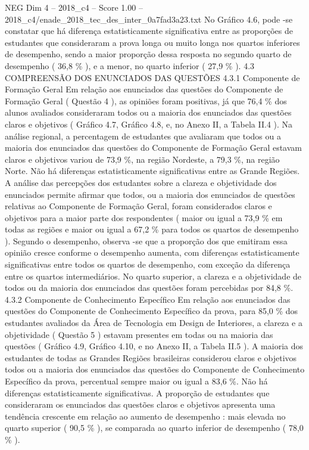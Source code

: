 \begin{textsample}{NEG Dim 4 – 2018\_c4 – Score 1.00 – 2018\_c4/enade\_2018\_tec\_des\_inter\_0a7fad3a23.txt}
No Gráfico 4.6, pode -se constatar que há diferença estatisticamente significativa entre as proporções de estudantes que consideraram a prova longa ou muito longa nos quartos inferiores de desempenho, sendo a maior proporção dessa resposta no segundo quarto de desempenho ( 36,8 \% ), e a menor, no quarto inferior ( 27,9 \% ). 4.3 COMPREENSÃO DOS ENUNCIADOS DAS QUESTÕES 4.3.1 Componente de Formação Geral Em relação aos enunciados das questões do Componente de Formação Geral ( Questão 4 ), as opiniões foram positivas, já que 76,4 \% dos alunos avaliados consideraram todos ou a maioria dos enunciados das questões claros e objetivos ( Gráfico 4.7, Gráfico 4.8, e, no Anexo II, a Tabela II.4 ).
Na análise regional, a percentagem de estudantes que avaliaram que todos ou a maioria dos enunciados das questões do Componente de Formação Geral estavam claros e objetivos variou de 73,9 \%, na região Nordeste, a 79,3 \%, na região Norte.
Não há diferenças estatisticamente significativas entre as Grande Regiões.
A análise das percepções dos estudantes sobre a clareza e objetividade dos enunciados permite afirmar que todos, ou a maioria dos enunciados de questões relativas ao Componente de Formação Geral, foram considerados claros e objetivos para a maior parte dos respondentes ( maior ou igual a 73,9 \% em todas as regiões e maior ou igual a 67,2 \% para todos os quartos de desempenho ).
Segundo o desempenho, observa -se que a proporção dos que emitiram essa opinião cresce conforme o desempenho aumenta, com diferenças estatisticamente significativas entre todos os quartos de desempenho, com exceção da diferença entre os quartos intermediários.
No quarto superior, a clareza e a objetividade de todos ou da maioria dos enunciados das questões foram percebidas por 84,8 \%. 4.3.2 Componente de Conhecimento Específico Em relação aos enunciados das questões do Componente de Conhecimento Específico da prova, para 85,0 \% dos estudantes avaliados da Área de Tecnologia em Design de Interiores, a clareza e a objetividade ( Questão 5 ) estavam presentes em todas ou na maioria das questões ( Gráfico 4.9, Gráfico 4.10, e no Anexo II, a Tabela II.5 ).
A maioria dos estudantes de todas as Grandes Regiões brasileiras considerou claros e objetivos todos ou a maioria dos enunciados das questões do Componente de Conhecimento Específico da prova, percentual sempre maior ou igual a 83,6 \%.
Não há diferenças estatisticamente significativas.
A proporção de estudantes que consideraram os enunciados das questões claros e objetivos apresenta uma tendência crescente em relação ao aumento de desempenho : mais elevada no quarto superior ( 90,5 \% ), se comparada ao quarto inferior de desempenho ( 78,0 \% ).

\end{textsample}
